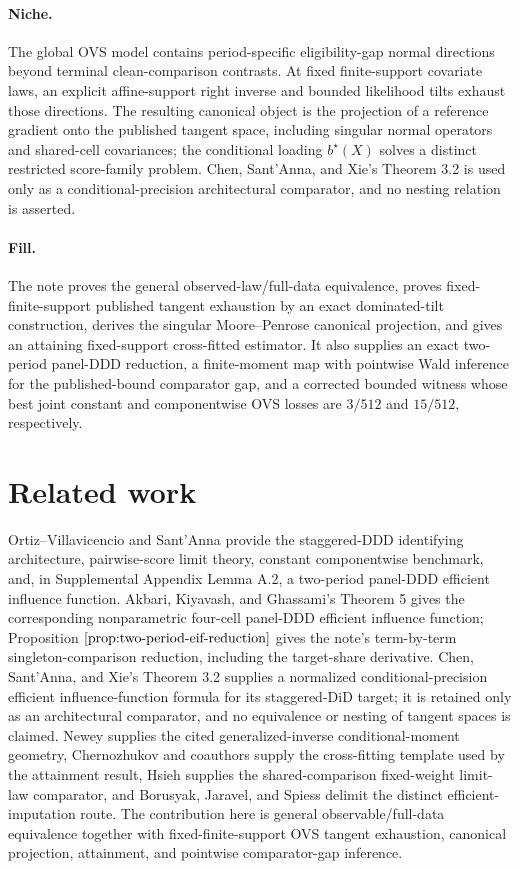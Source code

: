 \documentclass{article}
\begin{document}
\paragraph{Niche.} The global OVS model contains period-specific eligibility-gap normal directions beyond terminal clean-comparison contrasts.  At fixed finite-support covariate laws, an explicit affine-support right inverse and bounded likelihood tilts exhaust those directions.  The resulting canonical object is the projection of a reference gradient onto the published tangent space, including singular normal operators and shared-cell covariances; the conditional loading \(b^\star(X)\) solves a distinct restricted score-family problem.  Chen, Sant'Anna, and Xie's Theorem 3.2 is used only as a conditional-precision architectural comparator, and no nesting relation is asserted.

\paragraph{Fill.} The note proves the general observed-law/full-data equivalence, proves fixed-finite-support published tangent exhaustion by an exact dominated-tilt construction, derives the singular Moore--Penrose canonical projection, and gives an attaining fixed-support cross-fitted estimator.  It also supplies an exact two-period panel-DDD reduction, a finite-moment map with pointwise Wald inference for the published-bound comparator gap, and a corrected bounded witness whose best joint constant and componentwise OVS losses are \(3/512\) and \(15/512\), respectively.

\section{Related work}

Ortiz--Villavicencio and Sant'Anna provide the staggered-DDD identifying architecture, pairwise-score limit theory, constant componentwise benchmark, and, in Supplemental Appendix Lemma A.2, a two-period panel-DDD efficient influence function.  Akbari, Kiyavash, and Ghassami's Theorem 5 gives the corresponding nonparametric four-cell panel-DDD efficient influence function; Proposition \(\ref{prop:two-period-eif-reduction}\) gives the note's term-by-term singleton-comparison reduction, including the target-share derivative.  Chen, Sant'Anna, and Xie's Theorem 3.2 supplies a normalized conditional-precision efficient influence-function formula for its staggered-DiD target; it is retained only as an architectural comparator, and no equivalence or nesting of tangent spaces is claimed.  Newey supplies the cited generalized-inverse conditional-moment geometry, Chernozhukov and coauthors supply the cross-fitting template used by the attainment result, Hsieh supplies the shared-comparison fixed-weight limit-law comparator, and Borusyak, Jaravel, and Spiess delimit the distinct efficient-imputation route.  The contribution here is general observable/full-data equivalence together with fixed-finite-support OVS tangent exhaustion, canonical projection, attainment, and pointwise comparator-gap inference.
\end{document}
